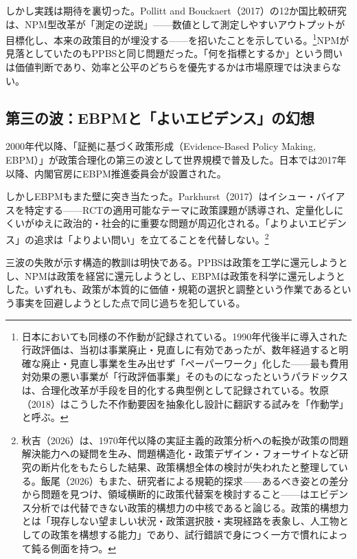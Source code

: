 しかし実践は期待を裏切った。Pollitt and Bouckaert（2017）の12か国比較研究は、NPM型改革が「測定の逆説」——数値として測定しやすいアウトプットが目標化し、本来の政策目的が埋没する——を招いたことを示している\cite{pollitt2017pmr}。\footnote{日本においても同様の不作動が記録されている。1990年代後半に導入された行政評価は、当初は事業廃止・見直しに有効であったが、数年経過すると明確な廃止・見直し事業を生み出せず「ペーパーワーク」化した——最も費用対効果の悪い事業が「行政評価事業」そのものになったというパラドックスは、合理化改革が手段を目的化する典型例として記録されている\cite{wakao2026}。牧原（2018）はこうした不作動要因を抽象化し設計に翻訳する試みを「作動学」と呼ぶ\cite{makihara2018}。}NPMが見落としていたのもPPBSと同じ問題だった。「何を指標とするか」という問いは価値判断であり、効率と公平のどちらを優先するかは市場原理では決まらない\cite{hood1991npm}。

\subsection{第三の波：EBPMと「よいエビデンス」の幻想}
\label{subsec:intro_ebpm}

2000年代以降、「証拠に基づく政策形成（Evidence-Based Policy Making, EBPM）」が政策合理化の第三の波として世界規模で普及した\cite{sanderson2002evidence}。日本では2017年以降、内閣官房にEBPM推進委員会が設置された\cite{sugitani2024naze}。

しかしEBPMもまた壁に突き当たった。Parkhurst（2017）はイシュー・バイアスを特定する——RCTの適用可能なテーマに政策課題が誘導され、定量化しにくいがゆえに政治的・社会的に重要な問題が周辺化される\cite{parkhurst2017politics}。「よりよいエビデンス」の追求は「よりよい問い」を立てることを代替しない\cite{sugitani2022}。\footnote{秋吉（2026）は、1970年代以降の実証主義的政策分析への転換が政策の問題解決能力への疑問を生み、問題構造化・政策デザイン・フォーサイトなど研究の断片化をもたらした結果、政策構想全体の検討が失われたと整理している\cite{akiyoshi2026}。飯尾（2026）もまた、研究者による規範的探求——あるべき姿との差分から問題を見つけ、領域横断的に政策代替案を検討すること——はエビデンス分析では代替できない政策的構想力の中核であると論じる\cite{iio2026}。政策的構想力とは「現存しない望ましい状況・政策選択肢・実現経路を表象し、人工物としての政策を構想する能力」であり、試行錯誤で身につく一方で慣れによって鈍る側面を持つ\cite{iio2026}。}

三波の失敗が示す構造的教訓は明快である。PPBSは政策を工学に還元しようとし、NPMは政策を経営に還元しようとし、EBPMは政策を科学に還元しようとした\cite{wildavsky1969ppbs,hood1991npm,parkhurst2017politics}。いずれも、政策が本質的に価値・規範の選択と調整という作業であるという事実を回避しようとした点で同じ過ちを犯している\cite{sugitani2021,sugitani2024naze,rittel1973}。

